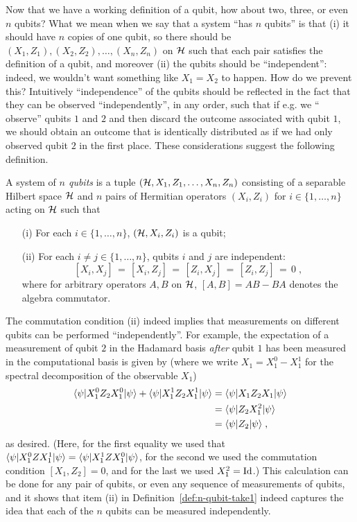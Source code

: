 Now that we have a working definition of a qubit, how about two, three, or even $n$ qubits? What we mean when we say that a system ``has $n$ qubits'' is that (i) it should have $n$ copies of one qubit, so there should be $(X_1,Z_1), (X_2,Z_2),\ldots,(X_n,Z_n)$ on $\mathcal{H}$ such that each pair satisfies the definition of a qubit, and moreover (ii) the qubits should be ``independent'': indeed, we wouldn't want something like $X_1=X_2$ to happen. How do we prevent this? Intuitively ``independence'' of the qubits should be reflected in the fact that they can be observed ``independently'', in any order, such that if e.g. we `` observe'' qubits $1$ and $2$ and then discard the outcome associated with qubit $1$, we should obtain an outcome that is identically distributed as if we had only observed qubit $2$ in the first place. These considerations suggest the following definition. 

\begin{definition}\label{def:n-qubit-take1}
A system of \emph{$n$ qubits} is a tuple $(\mathcal{H},X_1,Z_1,\ldots,X_n,Z_n)$ consisting of a separable Hilbert space $\mathcal{H}$ and $n$ pairs of Hermitian operators $(X_i,Z_i)$ for $i\in\{1,\ldots,n\}$ acting on $\mathcal{H}$ such that
\begin{enumerate}
\item[(i)] For each $i\in \{1,\ldots,n\}$, $(\mathcal{H},X_i,Z_i)$ is a qubit;
\item[(ii)] For each $i\neq j\in \{1,\ldots,n\}$, qubits $i$ and $j$ are independent:
\[ [X_i,X_j]\,=\,[X_i,Z_j]\,=\,[Z_i,X_j]\,=\,[Z_i,Z_j]\,=\,0\;,\]
where for arbitrary operators $A,B$ on $\mathcal{H}$, $[A,B]=AB-BA$ denotes the algebra commutator. 
\end{enumerate}
\end{definition}

The commutation condition (ii) indeed implies that measurements on different qubits can be performed ``independently''. For example, the expectation of a measurement of qubit $2$ in the Hadamard basis \emph{after} qubit $1$ has been measured in the computational basis is given by (where we write $X_1 = X_1^0 - X_1^1$ for the spectral decomposition of the observable $X_1$)
\begin{align*}
\langle\psi| X_1^0 Z_2 X_1^0 |\psi\rangle + \langle\psi| X_1^1 Z_2 X_1^1 |\psi\rangle &= \langle\psi| X_1 Z_2 X_1 |\psi\rangle \\
&= \langle\psi|  Z_2 X_1^2 |\psi\rangle\\
&= \langle\psi|  Z_2  |\psi\rangle\;,
\end{align*}
as desired. (Here, for the first equality we used that  $\langle\psi| X_1^0 Z X_1^1 |\psi\rangle  =  \langle\psi| X_1^1 Z X_1^0 |\psi\rangle $, for the second we used the commutation condition $[X_1,Z_2]=0$, and for the last we used $X_1^2=\mathop{\rm Id}\nolimits$.) This calculation can be done for any pair of qubits, or even any sequence of measurements of qubits, and it shows that item (ii) in Definition~\ref{def:n-qubit-take1} indeed captures the idea that each of the $n$ qubits can be measured independently. 

